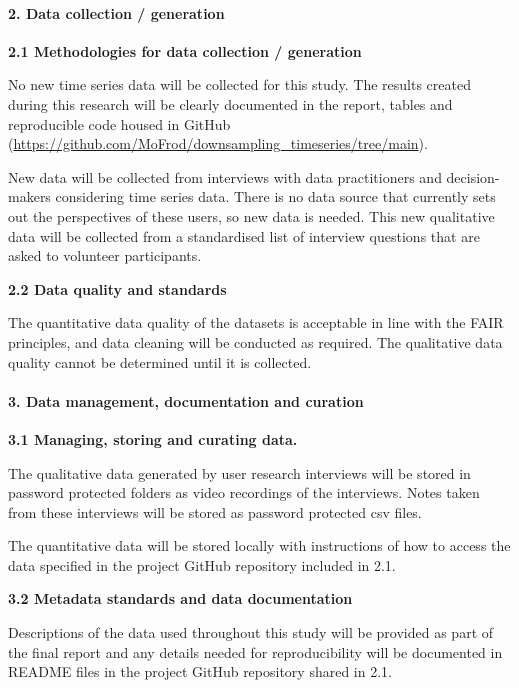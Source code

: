 \documentclass[
]{article}
\begin{document}
\hypertarget{data-collection-generation}{%
\paragraph{2. Data collection /
generation}\label{data-collection-generation}}

\textbf{2.1 Methodologies for data collection / generation}

No new time series data will be collected for this study. The results
created during this research will be clearly documented in the report,
tables and reproducible code housed in GitHub
(\url{https://github.com/MoFrod/downsampling_timeseries/tree/main}).

New data will be collected from interviews with data practitioners and
decision-makers considering time series data. There is no data source
that currently sets out the perspectives of these users, so new data is
needed. This new qualitative data will be collected from a standardised
list of interview questions that are asked to volunteer participants.

\textbf{2.2 Data quality and standards}

The quantitative data quality of the datasets is acceptable in line with
the FAIR principles, and data cleaning will be conducted as required.
The qualitative data quality cannot be determined until it is collected.

\hypertarget{data-management-documentation-and-curation}{%
\paragraph{3. Data management, documentation and
curation}\label{data-management-documentation-and-curation}}

\textbf{3.1 Managing, storing and curating data.}

The qualitative data generated by user research interviews will be
stored in password protected folders as video recordings of the
interviews. Notes taken from these interviews will be stored as password
protected csv files.

The quantitative data will be stored locally with instructions of how to
access the data specified in the project GitHub repository included in
2.1.

\textbf{3.2 Metadata standards and data documentation}

Descriptions of the data used throughout this study will be provided as
part of the final report and any details needed for reproducibility will
be documented in README files in the project GitHub repository shared in
2.1.
\end{document}

